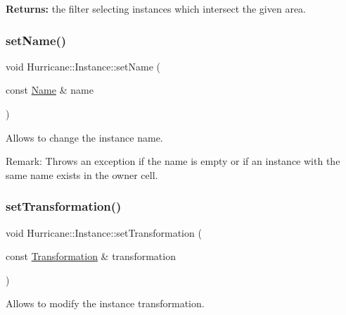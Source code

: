 {\bfseries Returns\+:} the filter selecting instances which intersect the given area. \mbox{\label{classHurricane_1_1Instance_ae3b67792d1659f1a20c6533b8843b905}} 
\subsubsection{\texorpdfstring{set\+Name()}{setName()}}
{\footnotesize\ttfamily void Hurricane\+::\+Instance\+::set\+Name (\begin{DoxyParamCaption}\item[{const \mbox{\hyperlink{classHurricane_1_1Name}{Name}} \&}]{name }\end{DoxyParamCaption})}

Allows to change the instance name.

\begin{DoxyParagraph}{Remark\+: Throws an exception if the name is empty or if an instance }
with the same name exists in the owner cell. 
\end{DoxyParagraph}
\mbox{\label{classHurricane_1_1Instance_a8890d2e1b2ba2542997454297e63512f}} 
\subsubsection{\texorpdfstring{set\+Transformation()}{setTransformation()}}
{\footnotesize\ttfamily void Hurricane\+::\+Instance\+::set\+Transformation (\begin{DoxyParamCaption}\item[{const \mbox{\hyperlink{classHurricane_1_1Transformation}{Transformation}} \&}]{transformation }\end{DoxyParamCaption})}

Allows to modify the instance transformation. \mbox{\label{classHurricane_1_1Instance_a9f626fd058c21ffc2ed5bfee8d29a853}} 
